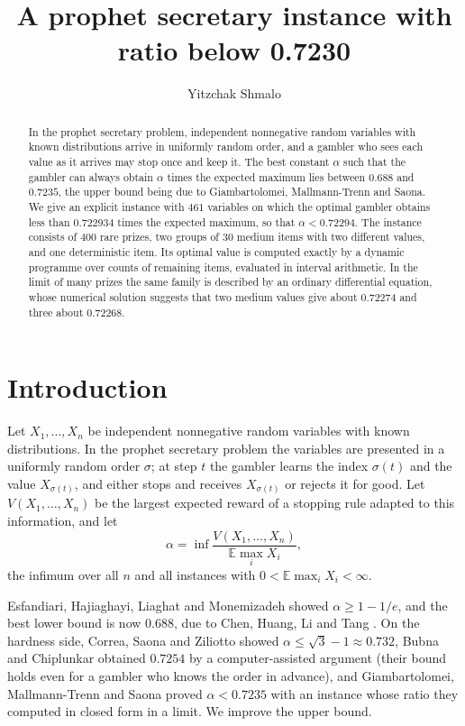 \documentclass[11pt]{amsart}
\title[A prophet secretary instance below 0.7235]{A prophet secretary instance with ratio below 0.7230}
\author{Yitzchak Shmalo}
\theoremstyle{remark}\newtheorem{remark}[theorem]{Remark}
\newcommand{\E}{\mathbb{E}}
\begin{document}
\begin{abstract}
In the prophet secretary problem, independent nonnegative random variables with known distributions arrive in
uniformly random order, and a gambler who sees each value as it arrives may stop once and keep it. The best constant
$\alpha$ such that the gambler can always obtain $\alpha$ times the expected maximum lies between $0.688$ and $0.7235$,
the upper bound being due to Giambartolomei, Mallmann-Trenn and Saona. We give an explicit instance with $461$
variables on which the optimal gambler obtains less than $0.722934$ times the expected maximum, so that
$\alpha<0.72294$. The instance consists of $400$ rare prizes, two groups of $30$ medium items with two different
values, and one deterministic item. Its optimal value is computed exactly by a dynamic programme over counts of
remaining items, evaluated in interval arithmetic. In the limit of many prizes the same family is described by an
ordinary differential equation, whose numerical solution suggests that two medium values give about $0.72274$ and
three about $0.72268$.
\end{abstract}
\maketitle

\section{Introduction}

Let $X_1,\dots,X_n$ be independent nonnegative random variables with known distributions. In the prophet secretary
problem the variables are presented in a uniformly random order $\sigma$; at step $t$ the gambler learns the index
$\sigma(t)$ and the value $X_{\sigma(t)}$, and either stops and receives $X_{\sigma(t)}$ or rejects it for good. Let
$V(X_1,\dots,X_n)$ be the largest expected reward of a stopping rule adapted to this information, and let
\[
\alpha=\inf\frac{V(X_1,\dots,X_n)}{\E\max_i X_i},
\]
the infimum over all $n$ and all instances with $0<\E\max_i X_i<\infty$.

Esfandiari, Hajiaghayi, Liaghat and Monemizadeh \cite{ehlm} showed $\alpha\ge 1-1/e$, and the best lower bound is now
$0.688$, due to Chen, Huang, Li and Tang \cite{chlt}. On the hardness side, Correa, Saona and Ziliotto \cite{csz} showed
$\alpha\le\sqrt3-1\approx0.732$, Bubna and Chiplunkar \cite{bc} obtained $0.7254$ by a computer-assisted argument (their
bound holds even for a gambler who knows the order in advance), and Giambartolomei, Mallmann-Trenn and Saona \cite{gms}
proved $\alpha<0.7235$ with an instance whose ratio they computed in closed form in a limit. We improve the upper bound.
\end{document}
